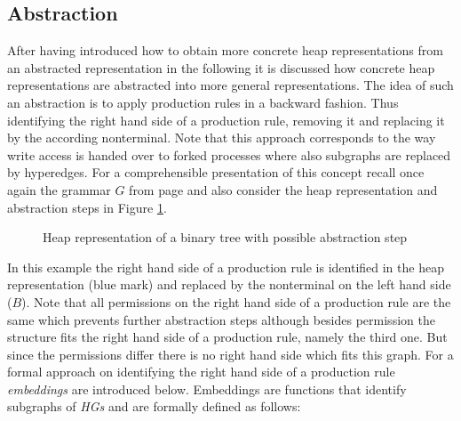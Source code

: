 \subsection{Abstraction}
\label{sec:abstraction}
	After having introduced how to obtain more concrete heap
	representations from an abstracted representation in the following it is
	discussed how concrete heap representations are abstracted into more general
	representations. The idea of such an abstraction is to apply production
	rules in a backward fashion. Thus identifying the right hand side of a
	production rule, removing it and replacing it by the according nonterminal.
	Note that this approach corresponds to the way write access is handed over
	to forked processes where also subgraphs are replaced by hyperedges. For a
	comprehensible presentation of this concept recall once
	again the grammar $G$ from page \pageref{eq:G} and also consider the heap
	representation and abstraction steps in Figure \ref{fig:bintreeabs}.
	\begin{figure}
		\begin{center}
			\resizebox{\linewidth}{!}{%
				
			}
			\caption{Heap representation of a binary tree with possible
				abstraction step}
			\label{fig:bintreeabs}
		\end{center}
	\end{figure}
	In this example the right hand side of a production rule is identified in
	the heap representation (blue mark) and replaced by the nonterminal on the
	left hand side ($B$). Note that all permissions on the right hand side of a
	production rule are the same which prevents further abstraction steps
	although besides permission the structure fits the right hand side of a
	production rule, namely the third one. But since the permissions differ
	there is no right hand side which fits this graph. For a formal approach on
	identifying the right hand side of a production rule \emph{embeddings} are
	introduced below. Embeddings are functions that identify subgraphs of
	\emph{\acp{HG}} and are formally defined as follows:

